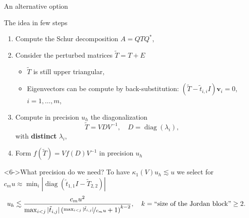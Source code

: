 \documentclass[aspectratio=169,xcolor=dvipsnames]{beamer}
\begin{document}
\begin{frame}{\faHammer\;An alternative option \parencite{HighamML}}

The idea in few steps
\begin{enumerate}
\item<1-> Compute the Schur decomposition $A = Q T Q^*$,
\item<2-> Consider the perturbed matrices $\tilde{T} = T + E$
\begin{itemize}
	\item<3-> $\tilde{T}$ is still upper triangular,
	\item<3-> Eigenvectors can be compute by back-substitution: $(\tilde{T}-\tilde{t}_{i,i} I) \mathbf{v}_i = 0$, $i=1,\ldots,m$,
\end{itemize}
\item<4-> Compute \alert{in precision $u_h$} the diagonalization
\[
\tilde{T} = V D V^{-1}, \quad D = \operatorname{diag}(\lambda_i),
\]
with \textbf{distinct} $\lambda_i$,
\item<5-> Form $f(\tilde{T}) = V f(D) V^{-1}$ \alert{in precision $u_h$}
\end{enumerate}

\begin{block}<6->{What precision do we need?}
To have $\kappa_1(V) u_h \lesssim u$ we select for $c_m u \approx \min_i|\operatorname{diag}(\tilde{t}_{1,1}I-\tilde{T}_{2,2})|$\vspace{-1em} 
\[
u_h \lesssim \frac{c_m u^2}{\max_{i < j}|\tilde{t}_{i,j}| \left( \nicefrac{\max_{i < j} |\tilde{t}_{i,j}|}{c_m u} + 1 \right)^{k-2}}, \quad k = \text{``size of the Jordan block''} \geq 2.
\]
\end{block}

\end{frame}
\end{document}
